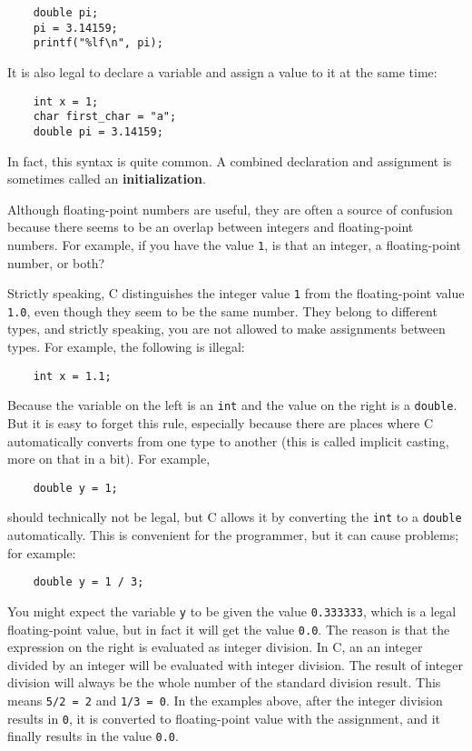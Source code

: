 \begin{verbatim}
    double pi;
    pi = 3.14159;
    printf("%lf\n", pi);
\end{verbatim}
%

It is also legal to declare a variable and assign a value to it at the
same time:

\begin{verbatim}
    int x = 1;
    char first_char = "a";
    double pi = 3.14159;
\end{verbatim}
%
In fact, this syntax is quite common.  A combined declaration
and assignment is sometimes called an {\bf initialization}.


Although floating-point numbers are useful, they are
often a source of confusion because there seems to be an
overlap between integers and floating-point numbers.  For
example, if you have the value {\tt 1}, is that an integer,
a floating-point number, or both?

Strictly speaking, C distinguishes the integer value {\tt 1}
from the floating-point value {\tt 1.0}, even though they
seem to be the same number.  They belong to
different types, and strictly speaking, you are not allowed
to make assignments between types.  For example, the following
is illegal:

\begin{verbatim}
    int x = 1.1;
\end{verbatim}
%
Because the variable on the left is an {\tt int}
and the value on the right is a {\tt double}.  But it is easy
to forget this rule, especially because there are places where C
automatically converts from one type to another (this is called implicit casting, more on that in a bit).
For example,

\begin{verbatim}
    double y = 1;
\end{verbatim}
%
should technically not be legal, but C allows it by converting the
{\tt int} to a {\tt double} automatically.  This is convenient for the programmer,
but it can cause problems; for example:

\begin{verbatim}
    double y = 1 / 3;
\end{verbatim}
%
You might expect the variable {\tt y} to be given the value
{\tt 0.333333}, which is a legal floating-point value, but in
fact it will get the value {\tt 0.0}.  The reason is that the
expression on the right is evaluated as integer division. In C, 
an an integer divided by an integer will be evaluated with integer division.
The result of integer division will always be the whole number of the standard division result.
This means {\tt 5/2 = 2} and {\tt 1/3 = 0}. In the examples above, after the integer division results in {\tt 0}, 
it is converted to floating-point value with the assignment, and it finally 
results in the value {\tt 0.0}.

